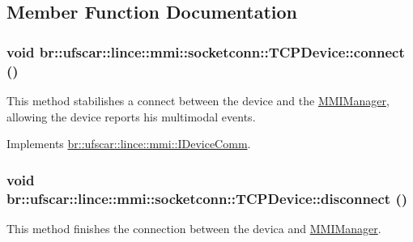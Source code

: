 \subsection{Member Function Documentation}
\hypertarget{classbr_1_1ufscar_1_1lince_1_1mmi_1_1socketconn_1_1TCPDevice_a2a474f7f39371460268525b0a840cd4f}{
\subsubsection[{connect}]{\setlength{\rightskip}{0pt plus 5cm}void br::ufscar::lince::mmi::socketconn::TCPDevice::connect ()}}
\label{classbr_1_1ufscar_1_1lince_1_1mmi_1_1socketconn_1_1TCPDevice_a2a474f7f39371460268525b0a840cd4f}


This method stabilishes a connect between the device and the \hyperlink{classbr_1_1ufscar_1_1lince_1_1mmi_1_1MMIManager}{MMIManager}, allowing the device reports his multimodal events. 



Implements \hyperlink{classbr_1_1ufscar_1_1lince_1_1mmi_1_1IDeviceComm_a53f48993f294b9a755125b6ccdb06ad4}{br::ufscar::lince::mmi::IDeviceComm}.

\hypertarget{classbr_1_1ufscar_1_1lince_1_1mmi_1_1socketconn_1_1TCPDevice_a5b1eca485752195ce49f03475229ca1f}{
\subsubsection[{disconnect}]{\setlength{\rightskip}{0pt plus 5cm}void br::ufscar::lince::mmi::socketconn::TCPDevice::disconnect ()}}
\label{classbr_1_1ufscar_1_1lince_1_1mmi_1_1socketconn_1_1TCPDevice_a5b1eca485752195ce49f03475229ca1f}


This method finishes the connection between the devica and \hyperlink{classbr_1_1ufscar_1_1lince_1_1mmi_1_1MMIManager}{MMIManager}. 



